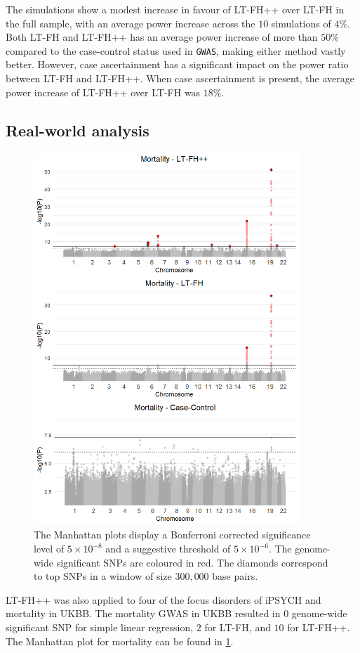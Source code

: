 The simulations show a modest increase in favour of LT-FH++ over LT-FH in the full sample, with an average power increase across the $ 10 $ simulations of $ 4\% $. Both LT-FH and LT-FH++ has an average power increase of more than $ 50\% $ compared to the case-control status used in \texttt{GWAS}, making either method vastly better. However, case ascertainment has a significant impact on the power ratio between LT-FH and LT-FH++. When case ascertainment is present, the average power increase of LT-FH++ over LT-FH was $ 18\% $.

\newpage

\subsection{Real-world analysis}
\begin{figure}
	\includegraphics[width=10cm]{results/manhattanPlot_mortality.png}
	\caption[Manhattan plots for LT-FH++, LT-FH, and case-control GWAS of mortality	in the UK Biobank]{The Manhattan plots display a Bonferroni corrected significance level of $ 5\times 10^{-8} $ and a suggestive threshold of $ 5\times 10^{-6} $. The genome-wide significant SNPs are coloured in red. The diamonds correspond to top	SNPs in a window of size $ 300,000 $ base pairs.}
	\label{fig:LTFH++_manhattanMortality}
\end{figure}
LT-FH++ was also applied to four of the focus disorders of iPSYCH and mortality in UKBB. The mortality GWAS in UKBB resulted in $ 0 $ genome-wide significant SNP for simple linear regression, $ 2 $ for LT-FH, and $ 10 $ for LT-FH++. The Manhattan plot for mortality can be found in \cref{fig:LTFH++_manhattanMortality}.

